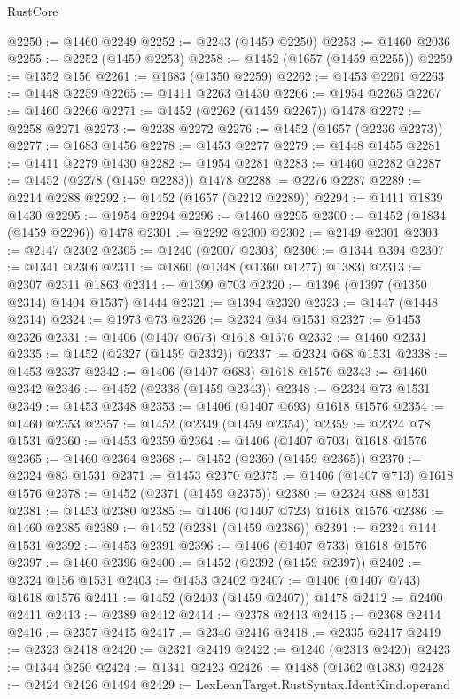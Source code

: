 \begin{lexlean}{RustCore}
\begin{coremodule}
@2250 := @1460 @2249
@2252 := @2243 (@1459 @2250)
@2253 := @1460 @2036
@2255 := @2252 (@1459 @2253)
@2258 := @1452 (@1657 (@1459 @2255))
@2259 := @1352 @156
@2261 := @1683 (@1350 @2259)
@2262 := @1453 @2261
@2263 := @1448 @2259
@2265 := @1411 @2263 @1430
@2266 := @1954 @2265
@2267 := @1460 @2266
@2271 := @1452 (@2262 (@1459 @2267)) @1478
@2272 := @2258 @2271
@2273 := @2238 @2272
@2276 := @1452 (@1657 (@2236 @2273))
@2277 := @1683 @1456
@2278 := @1453 @2277
@2279 := @1448 @1455
@2281 := @1411 @2279 @1430
@2282 := @1954 @2281
@2283 := @1460 @2282
@2287 := @1452 (@2278 (@1459 @2283)) @1478
@2288 := @2276 @2287
@2289 := @2214 @2288
@2292 := @1452 (@1657 (@2212 @2289))
@2294 := @1411 @1839 @1430
@2295 := @1954 @2294
@2296 := @1460 @2295
@2300 := @1452 (@1834 (@1459 @2296)) @1478
@2301 := @2292 @2300
@2302 := @2149 @2301
@2303 := @2147 @2302
@2305 := @1240 (@2007 @2303)
@2306 := @1344 @394
@2307 := @1341 @2306
@2311 := @1860 (@1348 (@1360 @1277) @1383)
@2313 := @2307 @2311 @1863
@2314 := @1399 @703
@2320 := @1396 (@1397 (@1350 @2314) @1404 @1537) @1444
@2321 := @1394 @2320
@2323 := @1447 (@1448 @2314)
@2324 := @1973 @73
@2326 := @2324 @34 @1531
@2327 := @1453 @2326
@2331 := @1406 (@1407 @673) @1618 @1576
@2332 := @1460 @2331
@2335 := @1452 (@2327 (@1459 @2332))
@2337 := @2324 @68 @1531
@2338 := @1453 @2337
@2342 := @1406 (@1407 @683) @1618 @1576
@2343 := @1460 @2342
@2346 := @1452 (@2338 (@1459 @2343))
@2348 := @2324 @73 @1531
@2349 := @1453 @2348
@2353 := @1406 (@1407 @693) @1618 @1576
@2354 := @1460 @2353
@2357 := @1452 (@2349 (@1459 @2354))
@2359 := @2324 @78 @1531
@2360 := @1453 @2359
@2364 := @1406 (@1407 @703) @1618 @1576
@2365 := @1460 @2364
@2368 := @1452 (@2360 (@1459 @2365))
@2370 := @2324 @83 @1531
@2371 := @1453 @2370
@2375 := @1406 (@1407 @713) @1618 @1576
@2378 := @1452 (@2371 (@1459 @2375))
@2380 := @2324 @88 @1531
@2381 := @1453 @2380
@2385 := @1406 (@1407 @723) @1618 @1576
@2386 := @1460 @2385
@2389 := @1452 (@2381 (@1459 @2386))
@2391 := @2324 @144 @1531
@2392 := @1453 @2391
@2396 := @1406 (@1407 @733) @1618 @1576
@2397 := @1460 @2396
@2400 := @1452 (@2392 (@1459 @2397))
@2402 := @2324 @156 @1531
@2403 := @1453 @2402
@2407 := @1406 (@1407 @743) @1618 @1576
@2411 := @1452 (@2403 (@1459 @2407)) @1478
@2412 := @2400 @2411
@2413 := @2389 @2412
@2414 := @2378 @2413
@2415 := @2368 @2414
@2416 := @2357 @2415
@2417 := @2346 @2416
@2418 := @2335 @2417
@2419 := @2323 @2418
@2420 := @2321 @2419
@2422 := @1240 (@2313 @2420)
@2423 := @1344 @250
@2424 := @1341 @2423
@2426 := @1488 (@1362 @1383)
@2428 := @2424 @2426 @1494
@2429 := LexLeanTarget.RustSyntax.IdentKind.operand

\end{coremodule}
\end{lexlean}

